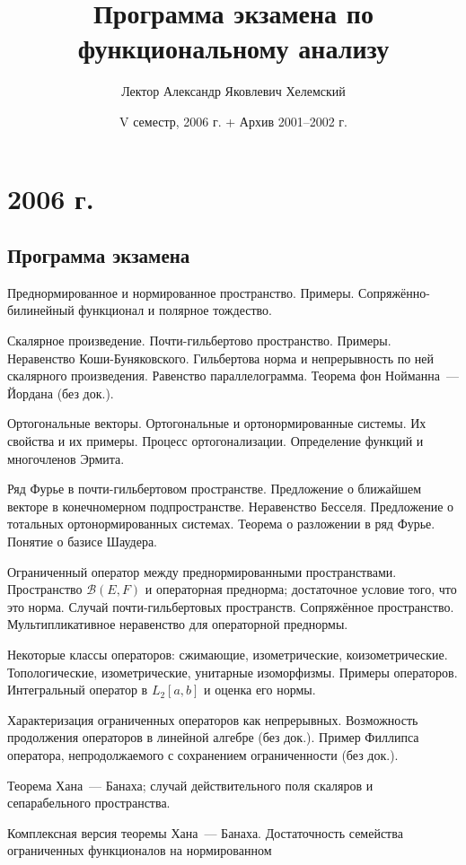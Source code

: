 \documentclass[a4paper]{article}
\title{Программа экзамена по функциональному анализу}
\author{Лектор Александр Яковлевич Хелемский}
\date{V семестр, 2006 г. + Архив 2001--2002 г.}
\begin{document}
\maketitle

\section*{2006 г.}

\subsection*{Программа экзамена}
\begin{nums}{-3}
\item Преднормированное и нормированное пространство. Примеры. Сопряжённо-билинейный функционал и полярное тождество.
\item Скалярное произведение. Почти-гильбертово пространство. Примеры. Неравенство Коши-Буняковского.
Гильбертова норма и непрерывность по ней скалярного произведения. Равенство параллелограмма.
Теорема фон Нойманна~--- Йордана (без док.).
\item Ортогональные векторы. Ортогональные и ортонормированные системы. Их свойства и их примеры.
Процесс ортогонализации. Определение функций и многочленов Эрмита.
\item Ряд Фурье в почти-гильбертовом пространстве. Предложение о ближайшем векторе в конечномерном подпространстве.
Неравенство Бесселя. Предложение о тотальных ортонормированных системах. Теорема о разложении в ряд Фурье.
Понятие о базисе Шаудера.
\item Ограниченный оператор между преднормированными пространствами. Пространство $\mathcal{B}(E,F)$ и операторная преднорма;
достаточное условие того, что это норма. Случай почти-гильбертовых пространств. Сопряжённое пространство.
Мультипликативное неравенство для операторной преднормы.
\item Некоторые классы операторов: сжимающие, изометрические, коизометрические. Топологические, изометрические,
унитарные изоморфизмы. Примеры операторов. Интегральный оператор в $L_2[a,b]$ и оценка его нормы.
\item Характеризация ограниченных операторов как непрерывных. Возможность продолжения операторов в линейной алгебре (без док.).
Пример Филлипса оператора, непродолжаемого с сохранением ограниченности (без док.).
\item Теорема Хана~--- Банаха; случай действительного поля скаляров и сепарабельного пространства.
\item Комплексная версия теоремы Хана~--- Банаха. Достаточность семейства ограниченных функционалов на нормированном

\end{nums}
\end{document}
